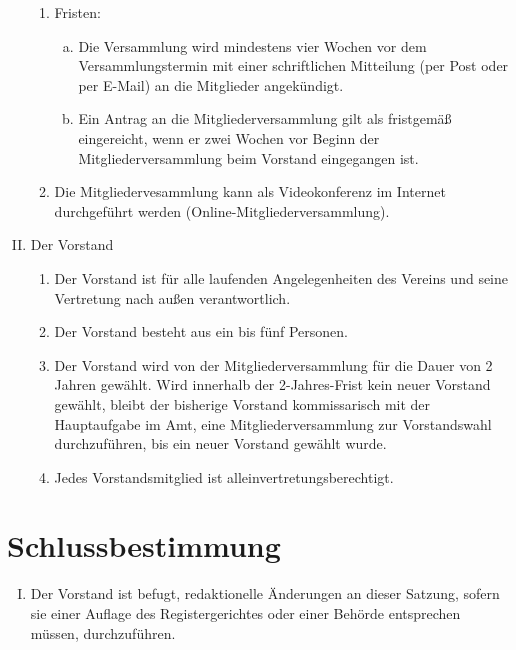 \documentclass[12pt,a4paper,titlepage]{scrartcl}
\begin{document}
\begin{enumerate}[I.]
\begin{enumerate}[1.]
	\item Fristen:
		\begin{enumerate}[a)]
		\item Die Versammlung wird mindestens vier Wochen vor dem 
		Versammlungstermin mit einer schriftlichen Mitteilung (per Post oder per E-Mail) an die Mitglieder 
		angekündigt.
		\item Ein Antrag an die Mitgliederversammlung gilt als fristgemäß eingereicht, wenn 
		er zwei Wochen vor Beginn der Mitgliederversammlung beim Vorstand 
		eingegangen ist.
		\end{enumerate}
	\item Die Mitgliedervesammlung kann als Videokonferenz im Internet durchgeführt werden (Online-Mitgliederversammlung).
	\end{enumerate}
\item Der Vorstand
	\begin{enumerate}[1.]
	\item Der Vorstand ist für alle laufenden Angelegenheiten des Vereins und seine 			Vertretung nach außen verantwortlich.
	\item Der Vorstand besteht aus ein bis fünf Personen.
	\item Der Vorstand wird von der Mitgliederversammlung für die Dauer von 2 Jahren gewählt. Wird innerhalb der 2-Jahres-Frist kein neuer Vorstand gewählt, bleibt der bisherige Vorstand kommissarisch mit der Hauptaufgabe im Amt, eine Mitgliederversammlung zur Vorstandswahl durchzuführen, bis ein neuer Vorstand gewählt wurde.
	\item Jedes Vorstandsmitglied ist alleinvertretungsberechtigt.
	\end{enumerate}
\end{enumerate}


\section{Schlussbestimmung}
\begin{enumerate}[I.]
\item Der Vorstand ist befugt, redaktionelle Änderungen an dieser Satzung, sofern sie 
einer Auflage des Registergerichtes oder einer Behörde entsprechen müssen, 
durchzuführen.
\end{enumerate}
\end{document}
